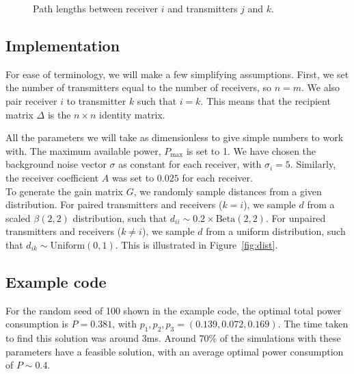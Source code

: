 \documentclass[twocolumn,secnumarabic,amssymb, nobibnotes, aps, prl,superscriptaddress]{revtex4-1}
\begin{document}
\begin{figure}[H]
\centering
{}
\caption{\label{fig:pathgain}Path lengths between receiver $i$ and transmitters $j$ and $k$.}
\end{figure}

\subsection{Implementation}
\noindent For ease of terminology, we will make a few simplifying assumptions.  First, we set the number of transmitters equal to the number of receivers, so $n=m$.  We also pair receiver $i$ to transmitter $k$ such that $i=k$.  This means that the recipient matrix $\Delta$ is the $n\times n$ identity matrix.

All the parameters we will take as dimensionless to give simple numbers to work with.  The maximum available power, $P_{\text{max}}$ is set to 1.  We have chosen the background noise vector $\sigma$ as constant for each receiver, with $\sigma_i = 5$.  Similarly, the receiver coefficient $A$ was set to $0.025$ for each receiver. \\ 

To generate the gain matrix $G$, we randomly sample distances from a given distribution.  For paired transmitters and receivers ($k=i$), we sample $d$ from a scaled $\beta(2,2)$ distribution, such that $d_{ii} \sim 0.2\times\text{Beta}(2,2)$.  For unpaired transmitters and receivers ($k\neq i$), we sample $d$ from a uniform distribution, such that $d_{ik} \sim \text{Uniform}(0,1)$.  This is illustrated in Figure~\ref{fig:dist}.

\subsection{Example code}
\noindent For the random seed of 100 shown in the example code, the optimal total power consumption is $P = 0.381$, with $p_1,p_2,p_3 = (0.139, 0.072, 0.169)$.  The time taken to find this solution was around 3ms.  Around 70\% of the simulations with these parameters have a feasible solution, with an average optimal power consumption of $P\sim0.4$.
\end{document}
